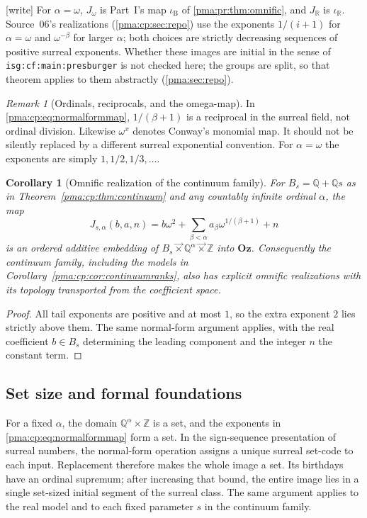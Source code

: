 \documentclass[11pt]{article}
\numberwithin{equation}{section}
\newtheorem{corollary}[corollary]{Corollary}
\theoremstyle{definition}
\theoremstyle{remark}
\newtheorem{remark}[remark]{Remark}
\newcommand{\Z}{\mathbb Z}
\newcommand{\Q}{\mathbb Q}
\newcommand{\R}{\mathbb R}
\newcommand{\Oz}{\mathbf{Oz}}
\newcommand{\lex}{\mathbin{\overrightarrow\times}}
\newcommand{\writetag}{\textup{\textsf{\small[write]}}}
\newcommand{\replabel}[1]{\nolinkurl{#1}}
\begin{document}
\noindent\writetag{} For $\alpha=\omega$, $J_\omega$ is Part~I's map
$\iota_{\mathrm B}$ of \cref{pma:pr:thm:omnific}, and $J_{\R}$ is $\iota_{\R}$.
Source~06's realizations (\cref{pma:cp:sec:repo}) use the exponents
$1/(i+1)$ for $\alpha=\omega$ and $\omega^{-\beta}$ for larger $\alpha$; both
choices are strictly decreasing sequences of positive surreal exponents.
Whether these images are initial in the sense of
\replabel{isg:cf:main:presburger} is not checked here; the groups are split,
so that theorem applies to them abstractly (\cref{pma:sec:repo}).

\begin{remark}[Ordinals, reciprocals, and the omega-map]
In \eqref{pma:cp:eq:normalformmap}, $1/(\beta+1)$ is a reciprocal in the
surreal field, not ordinal division. Likewise $\omega^x$ denotes
Conway's monomial map. It should not be silently replaced by a different
surreal exponential convention. For $\alpha=\omega$ the exponents
are simply $1,1/2,1/3,\ldots$.
\end{remark}

\begin{corollary}[Omnific realization of the continuum family]
For $B_s=\Q+\Q s$ as in Theorem~\ref{pma:cp:thm:continuum} and any countably
infinite ordinal $\alpha$, the map
\[
J_{s,\alpha}(b,a,n)
=b\omega^2+\sum_{\beta<\alpha}a_\beta\omega^{1/(\beta+1)}+n
\]
is an ordered additive embedding of
$B_s\lex\Q^\alpha\lex\Z$ into $\Oz$.
Consequently the continuum family, including the models in
Corollary~\ref{pma:cp:cor:continuumranks}, also has explicit omnific realizations
with its topology transported from the coefficient space.
\end{corollary}

\begin{proof}
All tail exponents are positive and at most $1$, so the extra exponent
$2$ lies strictly above them. The same normal-form argument applies, with
the real coefficient $b\in B_s$ determining the leading component and
the integer $n$ the constant term.
\end{proof}

\subsection{Set size and formal foundations}

For a fixed $\alpha$, the domain $\Q^\alpha\times\Z$ is a set, and
the exponents in \eqref{pma:cp:eq:normalformmap} form a set. In the sign-sequence
presentation of surreal numbers, the normal-form operation assigns a
unique surreal set-code to each input. Replacement therefore makes the
whole image a set. Its birthdays have an ordinal supremum; after
increasing that bound, the entire image lies in a single set-sized initial
segment of the surreal class. The same argument applies to the real model
and to each fixed parameter $s$ in the continuum family.
\end{document}
